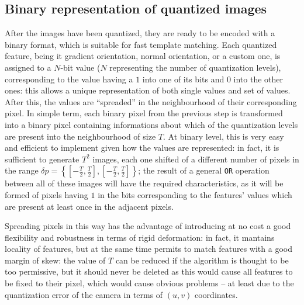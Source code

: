 \subsection{Binary representation of quantized images} \label{sec:linemod-binary}
After the images have been quantized, they are ready to be encoded
with a binary format, which is suitable for fast template
matching. Each quantized feature, being it gradient orientation,
normal orientation, or a custom one, is assigned to a $N$-bit value
($N$ representing the number of quantization levels), corresponding to
the value having a $1$ into one of its bits and $0$ into the other
ones: this allows a unique representation of both single values and
set of values. After this,
the values are ``spreaded'' in the neighbourhood of their corresponding
pixel. In simple term, each binary pixel from the previous step is
transformed into a binary pixel containing informations about which of
the quantization levels are present into the neighbourhood of size
$T$. At binary level, this is very easy and efficient to implement
given how the values are represented: in fact, it is sufficient to
generate $T^2$ images, each one shifted of a different number of
pixels in the range $\delta p = \left\{\left[-\frac{T}{2},
  \frac{T}{2}\right], \left[-\frac{T}{2},
  \frac{T}{2}\right]\right\}$; the result of a general \texttt{OR}
operation between all of these images will have the required
characteristics, as it will be formed of pixels having $1$ in the bits
corresponding to the features' values which are present at least once in
the adjacent pixels.

Spreading pixels in this way has the advantage of introducing at no
cost a good flexibility and robustness in terms of rigid deformation:
in fact, it mantains locality of features, but at the same time
permits to match features with a good margin of skew: the value of $T$
can be reduced if the algorithm is thought to be too permissive, but
it should never be deleted as this would cause all features to be
fixed to their pixel, which would cause obvious problems -- at least
due to the quantization error of the camera in terms of $(u,v)$
coordinates.

